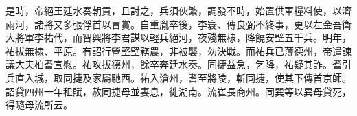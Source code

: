 \begin{pinyinscope}
 是時，帝絕王廷水奏朝貢，且討之，兵須伙繁，調發不時，始置供軍糧料使，以濟兩河，諸將又多張俘首以冒賞。自重胤卒後，李寰、傳良弼不終事，更以左金吾衛大將軍李祐代，而智興將李君謀以輕兵絕河，夜殘無棣，降饒安壁五千兵。明年，祐拔無棣、平原。有詔行營堅壁務農，非被襲，勿決戰。而祐兵已薄德州，帝遣諫議大夫柏耆宣慰。祐攻拔德州，餘卒奔廷水奏。同捷益急，乞降，祐疑其詐。耆引兵直入城，取同捷及家屬馳西。祐入滄州，耆至將陵，斬同捷，使其下傳首京師。詔貸四州一年租賦，赦同捷母並妻息，徙湖南。流崔長商州。同巽等以異母貸死，得隨母流所云。



\end{pinyinscope}